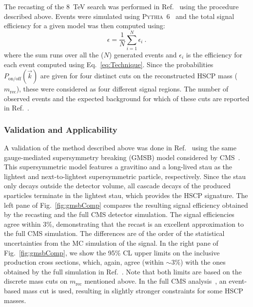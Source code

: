 The recasting of the 8~TeV search was performed in Ref.~\cite{Heisig:2015yla}
using the procedure described above.
Events were simulated using \textsc{Pythia}~6~\cite{Sjostrand:2006za} and
the total signal efficiency for a given model was then computed using:
%
\begin{equation*}
\epsilon = \frac{1}{N} \sum_{i=1}^{N} \epsilon_i~.
\end{equation*}
%
where the sum runs over all the ($N$) generated events and $\epsilon_i$ is the
efficiency for each event computed using Eq.~\eqref{eq:Technique}.
Since the probabilities $P_{\text{on/off}}(\vec{k})$ are given for
four distinct cuts on the reconstructed HSCP mass ($m_\text{rec}$),
these were considered as four different signal regions.
The number of observed events and the expected background for which
of these cuts are reported in Ref.~\cite{Khachatryan:2015lla}.

\subsubsection{Validation and Applicability}
\label{sec:ch5-validate}

A validation of the method described above was
done in Ref.~\cite{Heisig:2015yla} using the same gauge-mediated supersymmetry
breaking (GMSB) model considered by CMS~\cite{Khachatryan:2015lla}.
This supersymmetric model features a gravitino and a long-lived stau as the lightest and next-to-lightest
supersymmetric particle, respectively.
Since the stau only decays outside the detector volume, all
cascade decays of the produced sparticles terminate in the lightest stau,
which provides the HSCP signature.
The left pane of Fig.~\ref{fig:gmsbComp} compares the
resulting signal efficiency
obtained by the recasting and the full CMS detector
simulation. The signal efficiencies agree within 3\%, demonstrating
that the recast is an excellent approximation to the full CMS simulation. 
The differences are of the order of
the statistical uncertainties from the MC simulation of the signal.
In the right pane of Fig.~\ref{fig:gmsbComp}, we show the 95\% CL upper
limits on the inclusive production cross sections, which, again, agree
(within $\sim 3\%$) with the ones obtained by the full simulation in
Ref.~\cite{Khachatryan:2015lla}.
Note that both limits are based on the discrete mass cuts on $m_\text{rec}$ mentioned
above. In the full CMS analysis~\cite{Chatrchyan:2013oca}, an event-based
mass cut is used, resulting in slightly stronger constraints for some HSCP masses.

